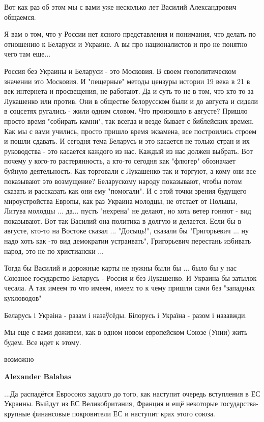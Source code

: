 \begin{itemize}
Вот как раз об этом мы с вами уже несколько лет Василий Александрович общаемся.

Я вам о том, что у России нет ясного представления и понимания, что делать по
отношению к Беларуси и Украине. А вы про националистов и про не понятно чего
там еще...

Россия без Украины и Беларуси - это Московия. В своем геополитическом значении
это Московия. И "пещерные" методы цензуры истории 19 века в 21 в век интернета
и просвещения, не работают. Да и суть то не в том, что кто-то за Лукашенко или
против. Они в обществе белорусском были и до августа и сидели в соцсетях
ругались - жили одним словом. Что произошло в августе? Пришло просто время
"собирать камни", так всегда и везде бывает с библейских времен. Как мы с вами
учились, просто пришло время экзамена, все построились строем и пошли сдавать.
И сегодня тема Беларусь и это касается не только стран и их руководства - это
касается каждого из нас. Каждый из нас должен выбрать. Вот почему у кого-то
растерянность, а кто-то сегодня как "флюгер" обозначает буйную деятельность.
Как торговали с Лукашенко так и торгуют, а кому они все показывают это
возмущение? Беларускому народу показывают, чтобы потом сказать и рассказать как
они ему "помогали". И с этой точки зрения будущего мироустройства Европы, как
раз Украина молодцы, не отстает от Польшы, Литува молодцы ... да... пусть
"нехрена" не делают, но хоть ветер гоняют - вид показывают. Вот так Василий она
политика в долгую и делается. Если бы в августе, кто-то на Востоке сказал ...
"Досыць!", сказали бы "Григорьевич ... ну надо хоть как -то вид демократии
устраивать", Григорьевич перестань избивать народ, это не по христиански ...

Тогда бы Василий и дорожные карты не нужны были бы ... было бы у нас Союзное
государство Беларусь - Россия и без Лукашенко. И Украина бы затылок чесала. А
так имеем то что имеем, имеем то к чему пришли сами без "западных кукловодов"

Беларусь і Украіна - разам і назаўсёды. Білорусь і Україна - разом і назавжди.

Мы еще с вами доживем, как в одном новом европейском Союзе (Унии) жить будем.
Все идет к этому.

\begin{itemize} %
возможно

\textbf{Alexander Balabas} 

...Да распадётся Евросоюз задолго до того, как наступит очередь вступления в ЕС
Украины. Выйдут из ЕС Великобритания, Франция и ещё некоторые государства-
крупные финансовые покровители ЕС и наступит крах этого союза.


\end{itemize}
\end{itemize}
